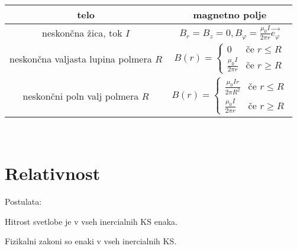 \documentclass[a4paper, oneside, 12pt]{article}
\theoremstyle{definition}
\newenvironment{itemize*}{\vspace{-10pt}\begin{itemize}\setlength{\itemsep}{0pt}\setlength{\parskip}{2pt}}{\end{itemize}}
\newcommand{\vv}{\vec}
\renewcommand{\phi}{\varphi}
\begin{document}
\begin{tabular}{c|c}
telo & magnetno polje\\ \hline \hline
neskončna žica, tok $I$ & $B_r = B_z = 0, B_{\phi} = \frac{\mu_0 I}{2 \pi r} \vv{e_{\varphi}}$ \\ \hline
neskončna valjasta lupina polmera $R$ & $B(r) =
                                \begin{cases}
                                0 &\text{če } r \leq R\\
                                \frac{\mu_0 I}{2 \pi r} & \text{če } r \geq R \end{cases}$\\ \hline
neskončni poln valj polmera $R$ & $B(r) =
                                \begin{cases}
                                \frac{\mu_0 I r}{2 \pi R^2} &\text{če } r \leq R\\
                                \frac{\mu_0 I}{2 \pi r} & \text{če } r \geq R \end{cases}$ \\ \hline

\end{tabular}\\

\section{Relativnost}
Postulata:
\begin{itemize*}
  \item Hitrost svetlobe je v vseh inercialnih KS enaka.
  \item Fizikalni zakoni so enaki v vseh inercialnih KS.
\end{itemize*}
\end{document}
